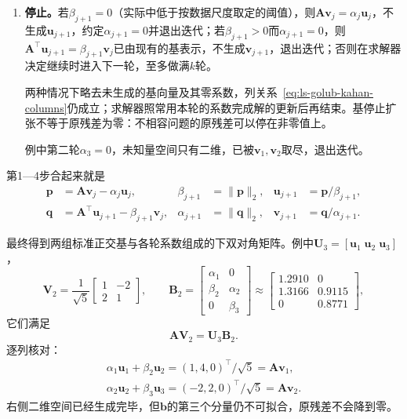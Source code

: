 \begin{enumerate}
 \item \textbf{停止。}若$\beta_{j+1}=0$（实际中低于按数据尺度取定的阈值），则$\bm A\bm v_j=\alpha_j\bm u_j$，不生成$\bm u_{j+1}$，约定$\alpha_{j+1}=0$并退出迭代；若$\beta_{j+1}>0$而$\alpha_{j+1}=0$，则$\bm A^\top\bm u_{j+1}=\beta_{j+1}\bm v_j$已由现有的基表示，不生成$\bm v_{j+1}$，退出迭代；否则在求解器决定继续时进入下一轮，至多做满$k$轮。
 
 两种情况下略去未生成的基向量及其零系数，列关系~\eqref{eq:ls-golub-kahan-columns}仍成立；求解器照常用本轮的系数完成解的更新后再结束。基停止扩张不等于原残差为零：不相容问题的原残差可以停在非零值上。
 
 例中第二轮$\alpha_3=0$，未知量空间只有二维，已被$\bm v_1,\bm v_2$取尽，退出迭代。
\end{enumerate}
第1—4步合起来就是
\begin{equation}
 \begin{aligned}
 \bm p&=\bm A\bm v_j-\alpha_j\bm u_j, & \beta_{j+1}&=\lVert\bm p\rVert_2, & \bm u_{j+1}&=\bm p/\beta_{j+1},\\
 \bm q&=\bm A^\top\bm u_{j+1}-\beta_{j+1}\bm v_j, & \alpha_{j+1}&=\lVert\bm q\rVert_2, & \bm v_{j+1}&=\bm q/\alpha_{j+1} .
 \end{aligned}
 \label{eq:ls-golub-kahan-step}
\end{equation}

最终得到两组标准正交基与各轮系数组成的下双对角矩阵。例中$\bm U_3=[\bm u_1\;\bm u_2\;\bm u_3]$，
\[
 \bm V_2=\frac1{\sqrt5}\begin{bmatrix}1&-2\\2&1\end{bmatrix},\qquad
 \bm B_2=\begin{bmatrix}\alpha_1&0\\\beta_2&\alpha_2\\0&\beta_3\end{bmatrix}
 \approx\begin{bmatrix}1.2910&0\\1.3166&0.9115\\0&0.8771\end{bmatrix},
\]
它们满足
\[
 \bm A\bm V_2=\bm U_3\bm B_2 .
\]
逐列核对：
\[
 \begin{gathered}
 \alpha_1\bm u_1+\beta_2\bm u_2=(1,4,0)^\top/\sqrt5=\bm A\bm v_1,\\
 \alpha_2\bm u_2+\beta_3\bm u_3=(-2,2,0)^\top/\sqrt5=\bm A\bm v_2 .
 \end{gathered}
\]
右侧二维空间已经生成完毕，但$\bm b$的第三个分量仍不可拟合，原残差不会降到零。


